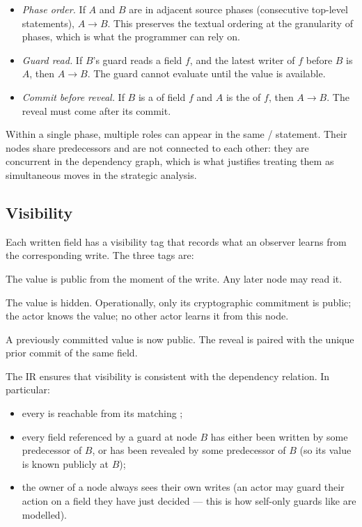 \begin{itemize}\itemsep1pt
\item \emph{Phase order.}  If $A$ and $B$ are in adjacent source
  phases (consecutive top-level statements), $A \to B$.  This
  preserves the textual ordering at the granularity of phases,
  which is what the programmer can rely on.
\item \emph{Guard read.}  If $B$'s guard reads a field $f$, and
  the latest writer of $f$ before $B$ is $A$, then $A \to B$.
  The guard cannot evaluate until the value is available.
\item \emph{Commit before reveal.}  If $B$ is a \REVEAL of field
  $f$ and $A$ is the \COMMIT of $f$, then $A \to B$.  The reveal
  must come after its commit.
\end{itemize}

Within a single phase, multiple roles can appear in the same
/ statement.  Their nodes share predecessors
and are not connected to each other: they are concurrent in the
dependency graph, which is what justifies treating them as
simultaneous moves in the strategic analysis.

\subsection{Visibility}
\label{sec:eventgraph:visibility}

Each written field has a visibility tag that records what an
observer learns from the corresponding write.  The three tags are:

\begin{description}\itemsep1pt
\item[\PUBLIC.]  The value is public from the moment of the write.
  Any later node may read it.
\item[\COMMIT.]  The value is hidden.  Operationally, only its
  cryptographic commitment is public; the actor knows the value;
  no other actor learns it from this node.
\item[\REVEAL.]  A previously committed value is now public.  The
  reveal is paired with the unique prior commit of the same field.
\end{description}

The IR ensures that visibility is consistent with the dependency
relation.  In particular:

\begin{itemize}\itemsep1pt
\item every \REVEAL is reachable from its matching \COMMIT;
\item every field referenced by a guard at node $B$ has either
  been written \PUBLIC by some predecessor of $B$, or has been
  revealed by some predecessor of $B$ (so its value is known
  publicly at $B$);
\item the owner of a node always sees their own writes (an actor
  may guard their action on a field they have just decided ---
  this is how self-only guards like  are
  modelled).
\end{itemize}

